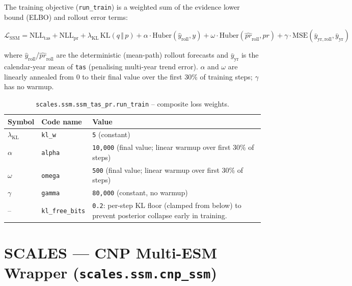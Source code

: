\documentclass[11pt]{article}
\begin{document}
The training objective (\texttt{run\_train}) is a weighted sum of the
evidence lower bound (ELBO) and rollout error terms:

\begin{equation}
\mathcal{L}_{\mathrm{SSM}} =
  \mathrm{NLL}_{\mathrm{tas}} + \mathrm{NLL}_{\mathrm{pr}}
  + \lambda_{\mathrm{KL}}\,\mathrm{KL}\!\left(q \,\Vert\, p\right)
  + \alpha \cdot \mathrm{Huber}\!\left(\hat{y}_{\mathrm{roll}}, y\right)
  + \omega \cdot \mathrm{Huber}\!\left(\hat{pr}_{\mathrm{roll}}, pr\right)
  + \gamma \cdot \mathrm{MSE}\!\left(\bar{y}_{\mathrm{yr,roll}}, \bar{y}_{\mathrm{yr}}\right)
\end{equation}

where $\hat{y}_{\mathrm{roll}}$/$\hat{pr}_{\mathrm{roll}}$ are the
deterministic (mean-path) rollout forecasts and $\bar{y}_{\mathrm{yr}}$ is
the calendar-year mean of \texttt{tas} (penalising multi-year trend error).
$\alpha$ and $\omega$ are linearly annealed from 0 to their final value over
the first 30\% of training steps; $\gamma$ has no warmup.

\begin{table}[h]
\centering
\caption{\texttt{scales.ssm.ssm\_tas\_pr.run\_train} -- composite loss weights.}
\begin{tabular}{@{}llL{7cm}@{}}
\toprule
Symbol & Code name & Value \\
\midrule
$\lambda_{\mathrm{KL}}$ & \texttt{kl\_w}  & \texttt{5} (constant) \\
$\alpha$                & \texttt{alpha}  & \texttt{10{,}000} (final value; linear warmup over first 30\% of steps) \\
$\omega$                & \texttt{omega}  & \texttt{500} (final value; linear warmup over first 30\% of steps) \\
$\gamma$                & \texttt{gamma}  & \texttt{80{,}000} (constant, no warmup) \\
--                       & \texttt{kl\_free\_bits} & \texttt{0.2}: per-step KL floor (clamped from below) to prevent posterior collapse early in training. \\
\bottomrule
\end{tabular}
\end{table}

\clearpage
\section{SCALES --- CNP Multi-ESM Wrapper (\texttt{scales.ssm.cnp\_ssm})}
\end{document}
